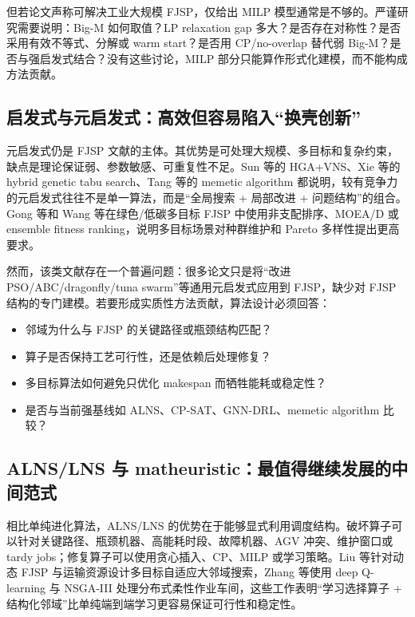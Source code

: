 \documentclass[UTF8,a4paper,11pt]{ctexart}
\begin{document}
但若论文声称可解决工业大规模 FJSP，仅给出 MILP 模型通常是不够的。严谨研究需要说明：Big-M 如何取值？LP relaxation gap 多大？是否存在对称性？是否采用有效不等式、分解或 warm start？是否用 CP/no-overlap 替代弱 Big-M？是否与强启发式结合？没有这些讨论，MILP 部分只能算作形式化建模，而不能构成方法贡献。

\subsection{启发式与元启发式：高效但容易陷入“换壳创新”}

元启发式仍是 FJSP 文献的主体。其优势是可处理大规模、多目标和复杂约束，缺点是理论保证弱、参数敏感、可重复性不足。Sun 等的 HGA+VNS、Xie 等的 hybrid genetic tabu search、Tang 等的 memetic algorithm 都说明，较有竞争力的元启发式往往不是单一算法，而是“全局搜索 + 局部改进 + 问题结构”的组合\cite{Sun2023HGA,Xie2023HGTS,Tang2024DFJSP}。Gong 等和 Wang 等在绿色/低碳多目标 FJSP 中使用非支配排序、MOEA/D 或 ensemble fitness ranking，说明多目标场景对种群维护和 Pareto 多样性提出更高要求\cite{Gong2021Green,Wang2024MOEAD}。

然而，该类文献存在一个普遍问题：很多论文只是将“改进 PSO/ABC/dragonfly/tuna swarm”等通用元启发式应用到 FJSP，缺少对 FJSP 结构的专门建模。若要形成实质性方法贡献，算法设计必须回答：
\begin{itemize}
    \item 邻域为什么与 FJSP 的关键路径或瓶颈结构匹配？
    \item 算子是否保持工艺可行性，还是依赖后处理修复？
    \item 多目标算法如何避免只优化 makespan 而牺牲能耗或稳定性？
    \item 是否与当前强基线如 ALNS、CP-SAT、GNN-DRL、memetic algorithm 比较？
\end{itemize}

\subsection{ALNS/LNS 与 matheuristic：最值得继续发展的中间范式}

相比单纯进化算法，ALNS/LNS 的优势在于能够显式利用调度结构。破坏算子可以针对关键路径、瓶颈机器、高能耗时段、故障机器、AGV 冲突、维护窗口或 tardy jobs；修复算子可以使用贪心插入、CP、MILP 或学习策略。Liu 等针对动态 FJSP 与运输资源设计多目标自适应大邻域搜索\cite{Liu2024ALNS}，Zhang 等使用 deep Q-learning 与 NSGA-III 处理分布式柔性作业车间\cite{Zhang2023DQLNSGAIII}，这些工作表明“学习选择算子 + 结构化邻域”比单纯端到端学习更容易保证可行性和稳定性。
\end{document}
